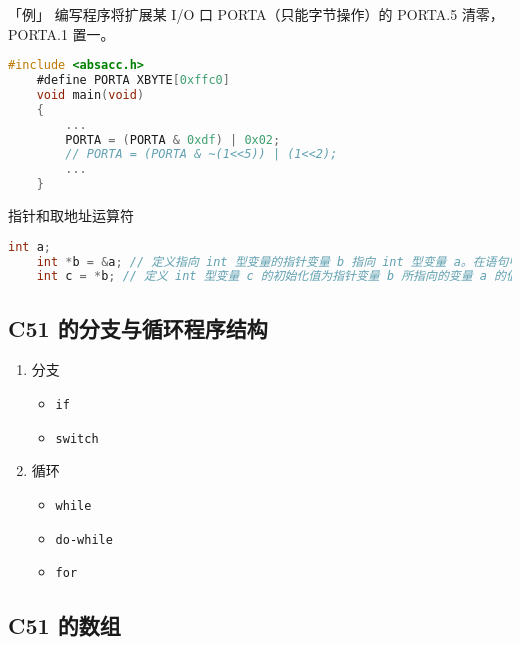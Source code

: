 \documentclass{beamer}
\begin{document}
\begin{frame}[fragile]{「例」 编写程序将扩展某 I/O 口 PORTA（只能字节操作）的 PORTA.5 清零，PORTA.1 置一。}
    \pause
    \begin{lstlisting}[language=C]
    #include <absacc.h>
    #define PORTA XBYTE[0xffc0]
    void main(void)
    {
        ...
        PORTA = (PORTA & 0xdf) | 0x02;
        // PORTA = (PORTA & ~(1<<5)) | (1<<2);
        ...
    }
    \end{lstlisting}
\end{frame}

\begin{frame}[fragile]{指针和取地址运算符}
    \begin{lstlisting}[language=C]
    int a;
    int *b = &a; // 定义指向 int 型变量的指针变量 b 指向 int 型变量 a。在语句中，* 用于申明该变量为指针型变量，& 用于取地址。
    int c = *b; // 定义 int 型变量 c 的初始化值为指针变量 b 所指向的变量 a 的值。在此语句中，* 用于解引用。注意和上一句中的 * 的区别。
    \end{lstlisting}
\end{frame}

\subsection{C51 的分支与循环程序结构}

\begin{frame}
\begin{enumerate}

\item
  分支

  \begin{itemize}
  
  \item
    \texttt{if}
  \item
    \texttt{switch}
  \end{itemize}
\item
  循环

  \begin{itemize}
  
  \item
    \texttt{while}
  \item
    \texttt{do-while}
  \item
    \texttt{for}
  \end{itemize}
\end{enumerate}
\end{frame}

\subsection{C51 的数组}
\end{document}
